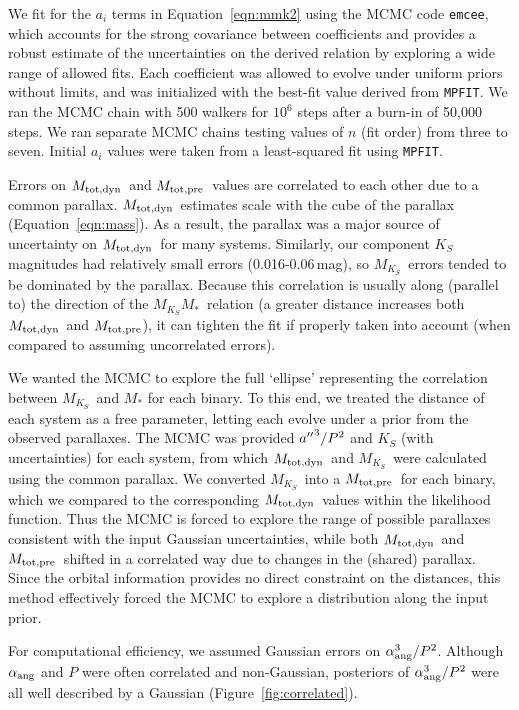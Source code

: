 \documentclass[twocolumn]{aastex62}
\newcommand{\mks}{$M_{K_S}$}
\newcommand{\mmk}{$M_{K_S}$\textendash$M_*$}
\newcommand{\mpred}{$M_{\rm{tot,pre}}$}
\newcommand{\mdyn}{$M_{\rm{tot,dyn}}$}
\begin{document}
We fit for the $a_i$ terms in Equation~\ref{eqn:mmk2} using the MCMC code {\tt emcee}, which accounts for the strong covariance between coefficients and provides a robust estimate of the uncertainties on the derived relation by exploring a wide range of allowed fits. Each coefficient was allowed to evolve under uniform priors without limits, and was initialized with the best-fit value derived from {\tt MPFIT}. We ran the MCMC chain with 500 walkers for $10^6$ steps after a burn-in of 50,000 steps. We ran separate MCMC chains testing values of $n$ (fit order) from three to seven. Initial $a_i$ values were taken from a least-squared fit using {\tt MPFIT}. 

Errors on \mdyn\ and \mpred\ values are correlated to each other due to a common parallax. \mdyn\ estimates scale with the cube of the parallax (Equation~\ref{eqn:mass}). As a result, the parallax was a major source of uncertainty on \mdyn\ for many systems. Similarly, our component $K_S$ magnitudes had relatively small errors (0.016-0.06\,mag), so \mks\ errors tended to be dominated by the parallax. Because this correlation is usually along (parallel to) the direction of the \mmk\ relation (a greater distance increases both \mdyn\ and \mpred), it can tighten the fit if properly taken into account (when compared to assuming uncorrelated errors). 
 
We wanted the MCMC to explore the full `ellipse' representing the correlation between \mks\ and $M_*$ for each binary. To this end, we treated the distance of each system as a free parameter, letting each evolve under a prior from the observed parallaxes. The MCMC was provided $a\mbox{$^{\prime\prime}$}^3/P^2$ and $K_S$ (with uncertainties) for each system, from which \mdyn\ and \mks\ were calculated using the common parallax. We converted \mks\ into a \mpred\ for each binary, which we compared to the corresponding \mdyn\ values within the likelihood function. Thus the MCMC is forced to explore the range of possible parallaxes consistent with the input Gaussian uncertainties, while both \mdyn\ and \mpred\ shifted in a correlated way due to changes in the (shared) parallax. Since the orbital information provides no direct constraint on the distances, this method effectively forced the MCMC to explore a distribution along the input prior. 

For computational efficiency, we assumed Gaussian errors on $\alpha_{\rm{ang}}^3/P^2$. Although $\alpha_{\rm{ang}}$ and $P$ were often correlated and non-Gaussian, posteriors of $\alpha_{\rm{ang}}^3/P^2$ were all well described by a Gaussian (Figure~\ref{fig:correlated}). 
\end{document}

